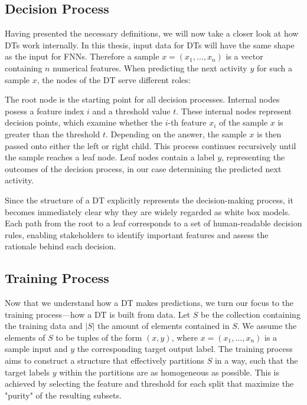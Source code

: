 \subsection{Decision Process}
Having presented the necessary definitions,
we will now take a closer look at how DTs work internally.
In this thesis, input data for DTs will have the same shape as the input for FNNs.
Therefore a sample $x = (x_1, ..., x_n)$ is a vector containing $n$ numerical features.
When predicting the next activity $y$ for such a sample $x$, the nodes of the DT serve different roles:

The root node is the starting point for all decision processes.
Internal nodes posess a feature index $i$ and a threshold value $t$.
These internal nodes represent decision points, which examine whether the $i$-th feature $x_i$ of the sample $x$
is greater than the threshold $t$.
Depending on the answer, the sample $x$ is then passed onto either the left or right child.
This process continues recursively until the sample reaches a leaf node.
Leaf nodes contain a label $y$, representing the outcomes of the decision process,
in our case determining the predicted next activity.


Since the structure of a DT explicitly represents the decision-making process,
it becomes immediately clear why they are widely regarded as white box models.
Each path from the root to a leaf corresponds to a set of human-readable decision rules,
enabling stakeholders to identify important features and assess the rationale behind each decision.

\subsection{Training Process}
Now that we understand how a DT makes predictions,
we turn our focus to the training process—how a DT is built from data.
Let $S$ be the collection containing the training data
and $|S|$ the amount of elements contained in $S$.
We assume the elements of $S$ to be tuples of the form $(x, y)$,
where $x = (x_1, ..., x_n)$ is a sample input and $y$ the corresponding target output label.
The training process aims to construct a structure that effectively partitions $S$ in a way,
such that the target labels $y$ within the partitions are as homogeneous as possible.
This is achieved by selecting the feature
and threshold for each split that maximize the "purity" of the resulting subsets.

